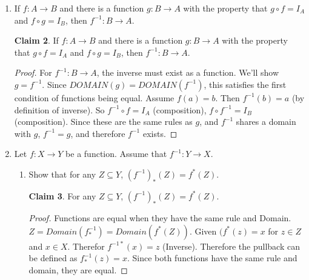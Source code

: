 \documentclass[11pt]{letter}
\theoremstyle{definition}
\newtheorem{claim}{Claim}
\begin{document}
\begin{description}
\begin{enumerate}
          \begin{claim}
            For any function $f: A\rightarrow B$, there is at most one function $g:B\rightarrow A$ so that $g\circ f=I_A$ and $f\circ g=I_B$.
          \end{claim}
          \begin{proof}
            Let us assume there is another function, $h$ which satisfies the conditions of $g$. For $h=g$, they must have the same domain and same rule. Since By definition $domain(h)=B$ and $domain(g)=B$, this is satisfied. Now let $f(a)=b$ where $a\in A$ and $b\in B$. So $h(f(a))=a$ (Identity). $So h(b)=a$. Now consider $g(f(a))=a$. So $g(b)=a$ (Identity). So $h=g$, so $g$ is unique.
          \end{proof}
          
          
			
	\item If $f:A\rightarrow B$ and there is a function $g:B\rightarrow A$ with the property that $g\circ f=I_A$ and $f\circ g=I_B$, then $f^{-1}:B\rightarrow A$.
          \begin{claim}
            If $f:A\rightarrow B$ and there is a function $g:B\rightarrow A$ with the property that $g\circ f=I_A$ and $f\circ g=I_B$, then $f^{-1}:B\rightarrow A$.
          \end{claim}
          \begin{proof}
            For $f^{-1}:B\rightarrow A$, the inverse must exist as a function. We'll show $g=f^{-1}$. Since $DOMAIN(g)=DOMAIN(f^{-1})$, this satisfies the first condition of functions being equal. Assume $f(a)=b$. Then $f^{-1}(b)=a$ (by definition of inverse). So $f^{-1}\circ f= I_A$ (composition),  $f\circ f^{-1}=I_B$ (composition). Since these are the same rules as $g$, and $f^{-1}$ shares a domain with $g$, $f^{-1}=g$, and therefore $f^{-1}$ exists. 
          \end{proof}
          
          
			
			\item Let $f:X\rightarrow Y$ be a function. Assume that $f^{-1}:Y\rightarrow X$. 
				\begin{enumerate}
				\item Show that for any $Z\subseteq Y$, $(f^{-1})_*(Z)=f^*(Z)$.
                                  \begin{claim}
                                    For any $Z\subseteq Y$, $(f^{-1})_*(Z)=f^*(Z)$.
                                  \end{claim}
                                  \begin{proof}
                                    Functions are equal when they have the same rule and Domain. $Z=Domain(f^{-1}_*)=Domain(f^*(Z))$. Given $(f^*(z)=x$ for $z\in Z$ and $x\in X$. Therefor $f^{-1 *}(x)=z$ (Inverse). Therefore the pullback can be defined as $f^{-1}_*(z)=x$. Since both functions have the same rule and domain, they are equal.
                                  \end{proof}
                                  

\end{enumerate}
\end{enumerate}
\end{description}
\end{document}
